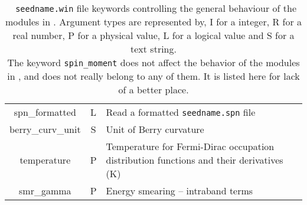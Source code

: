 \begin{table}[h!]
\begin{center}
\begin{tabular}{|c|c|p{6cm}|}
{\sc spn\_formatted}  & L & 
  Read a formatted {\tt seedname.spn} file\\
  {\sc berry\_curv\_unit} & S & Unit of Berry curvature\\ 
  {\sc temperature} & P & Temperature for Fermi-Dirac occupation distribution functions and their derivatives (K)\\
  {\sc smr\_gamma} & P & Energy smearing -- intraband terms \\
 \hline
\end{tabular}
\caption[Parameter file keywords controlling \postw.]  {{\tt
    seedname.win} file keywords controlling the general behaviour of
  the modules in \postw. Argument types are represented by, I for a
  integer, R for a real number, P for a
  physical value, L for a logical value and S for a text string.\\
  The keyword {\tt spin\_moment} does not affect
    the behavior of the modules in \postw, and does not really belong
    to any of them. It is listed here for lack of a better place.}
\label{parameter_keywords_postw90}
\end{center}
\end{table}


